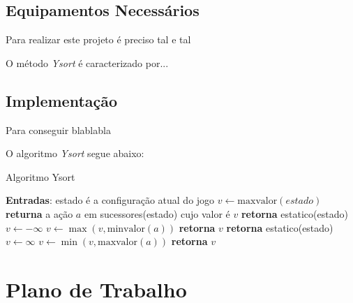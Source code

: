 \documentclass[a4paper,10pt]{article}  %
\begin{document}
\subsection{Equipamentos Necessários}


Para realizar este projeto é preciso tal e tal

O método \emph{Ysort} é caracterizado por...

\subsection{Implementação}

Para conseguir blablabla

O algoritmo \textit{Ysort} segue abaixo:

\begin{algorithm}
\caption{Algoritmo Ysort}\label{alg:ysort}
\begin{algorithmic}[1]
\State \textbf{Entradas}: estado é a configuração atual do jogo
\State $v\gets \mathrm{maxvalor}{(estado)}$
\State \textbf{returna} a ação $a$ em sucessores(estado) cujo valor é $v$ %
\EndFunction
{}
   \State \textbf{retorna} estatico(estado)
\EndIf
\State $v \gets -\infty$
    \State $v \gets \max{(v, \mathrm{minvalor}(a))}$
\EndFor
\State \textbf{retorna} $v$
\EndFunction
{}
   \State \textbf{retorna} estatico(estado)
\EndIf
\State $v \gets \infty$
    \State $v \gets \min{(v, \mathrm{maxvalor}(a))}$
\EndFor
\State \textbf{retorna} $v$
\EndFunction
\end{algorithmic}
\end{algorithm}

\section{Plano de Trabalho}
\end{document}
